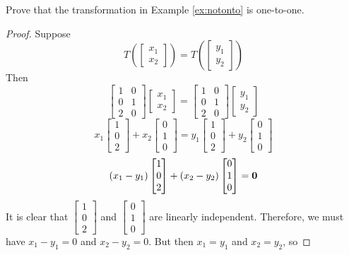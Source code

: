 \documentclass{ximera}
\renewcommand{\vec}[1]{{\bf #1}}
\begin{document}
\begin{example}
Prove that the transformation in Example \ref{ex:notonto} is one-to-one.
\begin{proof}
Suppose
$$T\left(\begin{bmatrix}x_1\\x_2\end{bmatrix}\right)=T\left(\begin{bmatrix}y_1\\y_2\end{bmatrix}\right)$$
Then
$$\begin{bmatrix}1&0\\0&1\\2&0\end{bmatrix}\begin{bmatrix}x_1\\x_2\end{bmatrix}=\begin{bmatrix}1&0\\0&1\\2&0\end{bmatrix}\begin{bmatrix}y_1\\y_2\end{bmatrix}$$
$$x_1\begin{bmatrix}1\\0\\2\end{bmatrix}+x_2\begin{bmatrix}0\\1\\0\end{bmatrix}=y_1\begin{bmatrix}1\\0\\2\end{bmatrix}+y_2\begin{bmatrix}0\\1\\0\end{bmatrix}$$
$$(x_1-y_1)\begin{bmatrix}1\\0\\2\end{bmatrix}+(x_2-y_2)\begin{bmatrix}0\\1\\0\end{bmatrix}=\vec{0}$$
It is clear that $\begin{bmatrix}1\\0\\2\end{bmatrix}$ and $\begin{bmatrix}0\\1\\0\end{bmatrix}$ are linearly independent.  Therefore, we must have $x_1-y_1=0$ and $x_2-y_2=0$.  But then $x_1=y_1$ and $x_2=y_2$, so 

\end{proof}
\end{example}
\end{document}
